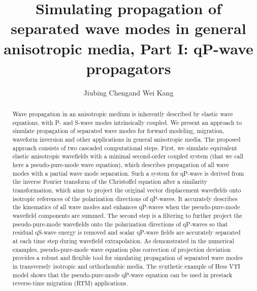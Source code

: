 
\title{Simulating propagation of separated wave modes in general anisotropic media, Part I: qP-wave propagators}

\author{Jiubing Cheng\footnotemark[1] and Wei Kang\footnotemark[2]}

\address{
\footnotemark[1] State Key Laboratory of Marine Geology, Tongji University, Shanghai, China. E-mail: cjb1206@tongji.edu.cn\\
\footnotemark[2] School of Ocean and Earth Science, Tongji University, Shanghai, China. E-mail: w.kang\_1986@hotmail.com
}


\maketitle

\begin{abstract}
Wave propagation in an anisotropic medium is inherently described by elastic wave equations, with P- and S-wave modes
intrinsically coupled. We present an approach to simulate propagation of separated wave modes for
 forward modeling,
 migration, waveform inversion and other applications in general anisotropic media.
The proposed approach consists of two cascaded computational steps. First, we simulate equivalent
 elastic anisotropic wavefields with a minimal second-order coupled system 
(that we call here a pseudo-pure-mode wave equation),
which describes propagation of all wave modes with a partial wave mode separation. Such a system for qP-wave
 is derived from the inverse Fourier transform of the Christoffel equation after a
 similarity transformation, which aims to project the original vector displacement wavefields onto isotropic
 references of the polarization directions of qP-waves. It accurately describes the kinematics
 of all wave modes and enhances qP-waves when the pseudo-pure-mode wavefield components are summed.
 The second step is a filtering to further project the pseudo-pure-mode wavefields onto the polarization directions
 of qP-waves so that residual qS-wave energy is removed and scalar qP-wave fields are accurately separated
 at each time step during wavefield extrapolation.
As demonstrated in the numerical examples, pseudo-pure-mode wave equation plus
correction of projection deviation provides a robust and flexible
tool for simulating propagation of separated wave modes in
transversely isotropic and orthorhombic media.
The synthetic example of Hess VTI model shows that
the pseudo-pure-mode qP-wave equation can be used in prestack reverse-time migration (RTM) applications.
\end{abstract}

